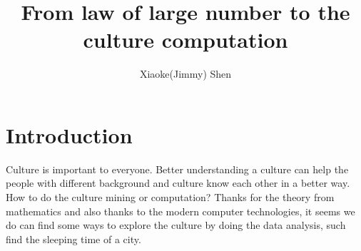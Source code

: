 \documentclass[a4paper,12pt]{article}
\begin{document}
\renewcommand\labelenumi{(\theenumi)}
\renewcommand{\vec}[1]{\mathbf{#1}}
\title {From law of large number to the culture computation }
\author{Xiaoke(Jimmy) Shen}
\maketitle
\section{Introduction}
Culture is important to everyone. Better understanding a culture can help the people with different background and culture know each other in a better way. How to do the culture mining or computation? Thanks for the theory from mathematics and also thanks to the modern computer technologies, it seems we do can find some ways to explore the culture by doing the data analysis, such find the sleeping time of a city.\\
\end{document}
